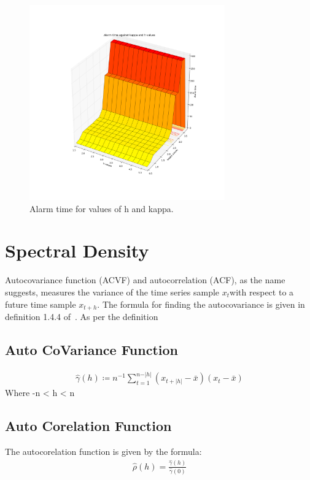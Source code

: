 \documentclass{article}
\begin{document}
\begin{figure}[ht!]
  \centering
  \includegraphics[width=0.75\textwidth]{images/1d_online/alarm}
  \caption{Alarm time for values of h and kappa.\label{fig:1d_o_alarm}}
\end{figure}

\section{Spectral Density}
Autocovariance function (ACVF) and autocorrelation (ACF), as the name suggests, measures the variance of the time series sample $x_{t} $with respect to a future time sample $ x_{t+h} $.  The formula for finding the autocovariance is given in definition 1.4.4 of~\cite{itsf}.
As per the definition 

\subsection{Auto CoVariance Function}
\begin{align}
  \label{eq_acvf}
  \hat{\gamma}(h) \coloneqq n^{-1} \sum_{t = 1}^{n - \vert h \vert} (x_{t+|h|} - \bar{x}) (x_{t} - \bar{x})
\end{align}
Where -n < h < n

\subsection{Auto Corelation Function}

The autocorelation function is given by the formula:
\begin{align}
  \label{eq_acf}
  \hat{\rho}(h) = \frac{\hat{\gamma}(h)}{\hat{\gamma}(0)}
\end{align}
\end{document}

